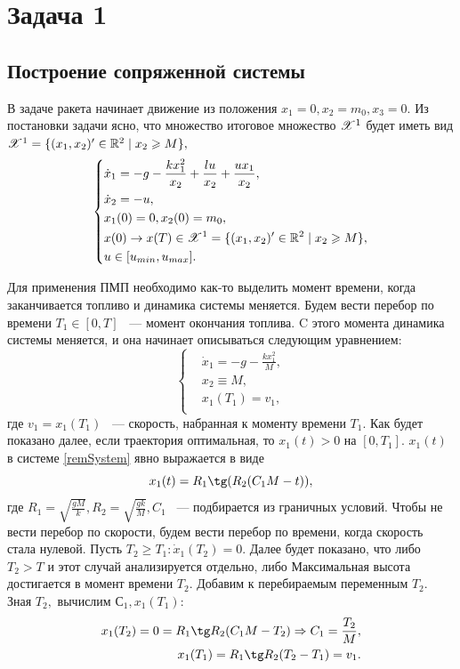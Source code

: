 \documentclass[10pt,pdf,hyperref={unicode}]{beamer}
\begin{document}
	\newpage
	\section{Задача 1}
	\subsection{Построение сопряженной системы}
	В задаче ракета начинает движение из положения $x_1 = 0, x_2 = m_0, x_3 = 0.$
	Из постановки задачи ясно, что множество итоговое множество ${\mathscr{X}}^1$ будет иметь вид 
	\({\mathscr{X}}^1 = \{ (x_1, x_2) ^ \prime \in \mathbb{R}^2 \mid x_2 \geqslant M\},\)
	\begin{equation}\label{Task1}
	\left\{
	\begin{aligned}
	&\dot x_1 = -g - \frac{k x_1^2}{x_2} + \frac{lu}{x_2} + \frac{u x_1}{x_2},\\
	&\dot x_2 = -u,\\
	&x_1(0) = 0, x_2(0) = m_0,\\
	& x(0) \rightarrow x(T) \in {\mathscr{X}}^1 = \{ (x_1, x_2) ^ \prime \in \mathbb{R}^2 \mid x_2 \geqslant M\},\\
	&u \in [u_{min}, u_{max}].\\
	\end{aligned}
	\right.
	\end{equation}

	Для применения ПМП необходимо как-то выделить момент времени, когда заканчивается топливо и динамика системы меняется. 
	Будем вести перебор по времени $T_1 \in [0, T]$ ~--- момент окончания топлива.
	C этого момента динамика системы меняется, и она начинает описываться следующим уравнением:
	\begin{equation}\label{remSystem}
	\left\{
	\begin{aligned}
	& \dot x_1 = -g - \frac{kx_1^2}{M},\\
	& x_2 \equiv M,\\
	& x_1(T_1) = v_1,\\
	\end{aligned}
	\right.
	\end{equation}
	где $v_1 = x_1(T_1)$ ~--- скорость, набранная к моменту времени $T_1.$ 
	Как будет показано далее, если траектория оптимальная, то $x_1(t) > 0$ на $[0, T_1].$
	$x_1(t)$ в системе \eqref{remSystem} явно выражается в виде
	\[
	x_1(t) = R_1 \tg (R_2(C_1M - t)),
	\]
	где $R_1 = \sqrt{\frac{gM}{k}}, R_2 = \sqrt{\frac{gk}{M}}, C_1$ ~--- подбирается из граничных условий.
	Чтобы не вести перебор по скорости, будем вести перебор по времени, когда скорость стала нулевой. 
	Пусть $T_2 \ge T_1: \dot x_1(T_2) = 0.$ Далее будет показано, что либо $T_2 > T$ и этот случай анализируется отдельно, либо
	Максимальная высота достигается в момент времени $T_2.$ Добавим к перебираемым переменным $T_2.$
	Зная $T_2,$ вычислим $С_1, x_1(T_1):$ 
	\[
	\begin{aligned}
	x_1(T_2) = 0 = R_1\tg R_2(C_1M - T_2) \Rightarrow C_1 = \frac{T_2}{M},\\
	x_1(T_1) = R_1\tg R_2(T_2 - T_1) = v_1.
	\end{aligned}
	\]
\end{document}
